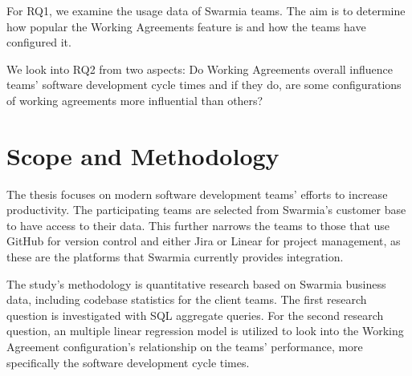 For RQ1, we examine the usage data of Swarmia teams. The aim is to determine how popular the Working Agreements feature is and how the teams have configured it. 

We look into RQ2 from two aspects: Do Working Agreements overall influence teams' software development cycle times and if they do, are some configurations of working agreements more influential than others? 

\section{Scope and Methodology}

The thesis focuses on modern software development teams' efforts to increase productivity. The participating teams are selected from Swarmia's customer base to have access to their data. This further narrows the teams to those that use GitHub for version control and either Jira or Linear for project management, as these are the platforms that Swarmia currently provides integration. 

The study's methodology is quantitative research based on Swarmia business data, including codebase statistics for the client teams. The first research question is investigated with SQL aggregate queries. For the second research question, an multiple linear regression model is utilized to look into the Working Agreement configuration's relationship on the teams' performance, more specifically the software development cycle times. 
